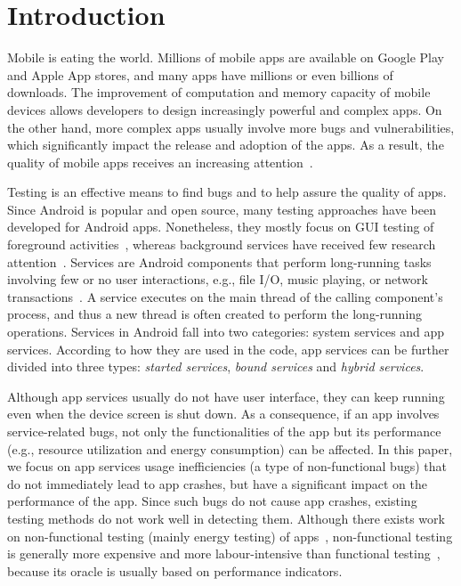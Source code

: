\documentclass[conference]{IEEEtran}
\begin{document}
\IEEEdisplaynontitleabstractindextext
\IEEEpeerreviewmaketitle

\section{Introduction}
Mobile is eating the world. Millions of mobile apps are available on Google Play
and Apple App stores, and many apps have millions or even billions of downloads.
The improvement of computation and memory capacity of mobile devices allows
developers to design increasingly powerful and complex apps. On the other hand,
more complex apps usually involve more bugs and vulnerabilities, which
significantly impact the release and adoption of the apps.
As a result, the quality of mobile apps receives an increasing
attention~\cite{ReavesBGABCDHKS16,AnandNHY12,MachiryTN13,ChoiNS13,LiuXC14,BanerjeeC0R14,LiuXCL14,HechtBRMD15,BehrouzSBM16,MirzaeiGBSM16,SuMCWYYPLS17,FanSCMLXPS18}.

Testing is an effective means to find bugs and to help assure the quality of
apps.
Since Android is popular and open source, many testing approaches have
been developed for Android apps. Nonetheless, they mostly focus on GUI testing
of foreground activities~\cite{monkey,AnandNHY12,MachiryTN13,ChoiNS13,MirzaeiGBSM16,BaekB16,SuMCWYYPLS17,SongQH17},
whereas background services have received few research
attention~\cite{ZhangLLC17,ma2018}. Services are Android components that perform
long-running tasks involving few or no user interactions, e.g., file I/O, music
playing, or network transactions~\cite{Androidservice}. A service executes on
the main thread of the calling component's process, and thus a new thread is
often created to perform the long-running operations. Services in Android fall
into two categories: system services and app services.
According to how they are used in the code, app services can
be further divided into three types:
\textit{started services}, \textit{bound services} and \textit{hybrid services}.

Although app services usually do not have user interface, they can keep running
even when the device screen is shut down. As a consequence, if an app involves
service-related bugs, not only the functionalities of the app but its
performance (e.g., resource utilization and energy consumption) can be affected.
In this paper, we focus on app services usage inefficiencies (a type of
non-functional bugs) that do not immediately lead to app crashes, but
have a significant impact on the performance of the app.
Since such bugs do not cause app crashes, existing testing methods do
not work well in detecting them.
Although there exists work on non-functional testing (mainly energy testing) of
apps~\cite{LiuXC14,BanerjeeC0R14,LiuXCL14,BehrouzSBM16,JabbarvandM17},
non-functional testing is generally more expensive and more labour-intensive than functional
testing~\cite{BehrouzSBM16}, because its oracle is usually based on performance
indicators.
\end{document}
